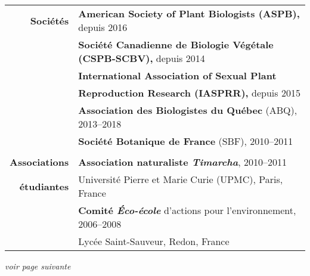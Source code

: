 \documentclass[letterpaper,10pt]{article}
\begin{document}
\begin{tabular}{r|p{14cm}}

\textbf{Sociétés}

 & \textbf{American Society of Plant Biologists (ASPB),} depuis 2016
   \vspace{2mm} \\

 & \textbf{Société Canadienne de Biologie Végétale (CSPB-SCBV),} depuis 2014
   \vspace{2mm} \\

 & \textbf{International Association of Sexual Plant} \\
 & \textbf{Reproduction Research (IASPRR),} depuis 2015
   \vspace{2mm} \\

 & \textbf{Association des Biologistes du Québec} (ABQ), 2013--2018
   \vspace{2mm} \\

 & \textbf{Société Botanique de France} (SBF), 2010--2011 \\

\multicolumn{2}{c}{} \\

\textbf{Associations}
  & \textbf{Association naturaliste \emph{Timarcha}}, 2010--2011 \\
\textbf{étudiantes}
  & Université Pierre et Marie Curie (UPMC), Paris, France
    \vspace{2mm} \\

  & \textbf{Comité \emph{Éco-école}} d’actions pour l’environnement, 2006--2008 \\
  & Lycée Saint-Sauveur, Redon, France \\

\end{tabular}

\vspace{3mm}
\hfill \emph{\small voir page suivante}
\end{document}

